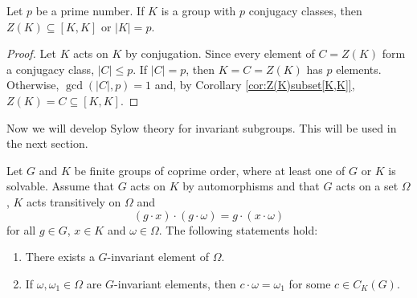 \begin{corollary}
  Let $p$ be a prime number. If $K$ is a group with $p$ conjugacy classes, then 
  $Z(K)\subseteq[K,K]$ or $|K|=p$. 
\end{corollary}

\begin{proof}
  Let $K$ acts on $K$ by conjugation. Since every element of $C=Z(K)$
  form a conjugacy class, $|C|\leq p$. If $|C|=p$, then $K=C=Z(K)$
  has $p$ elements. Otherwise, $\gcd(|C|,p)=1$ and, by Corollary \ref{cor:Z(K)subset[K,K]}, $Z(K)=C\subseteq
 [K,K]$.
\end{proof}

Now we will develop Sylow theory for invariant subgroups. This will be used
in the next section. 

\begin{lemma}[Glauberman]
	Let $G$ and $K$ be finite groups of coprime order, where at least one of $G$ or $K$ is solvable. 
	Assume that $G$ acts on $K$ by automorphisms and that
	$G$ acts on a set $\Omega$,
	$K$ acts transitively on $\Omega$ and  
	\[
	(g\cdot x)\cdot (g\cdot\omega)=g\cdot (x\cdot\omega)
	\]
	for all $g\in G$, $x\in K$ and $\omega\in\Omega$. 
	The following statements hold:
	\begin{enumerate}
	\item There exists a $G$-invariant element of $\Omega$.
	\item If $\omega,\omega_1\in\Omega$ are $G$-invariant elements, then 
	$c\cdot\omega=\omega_1$ for some $c\in C_K(G)$. 
	\end{enumerate}
\end{lemma}


